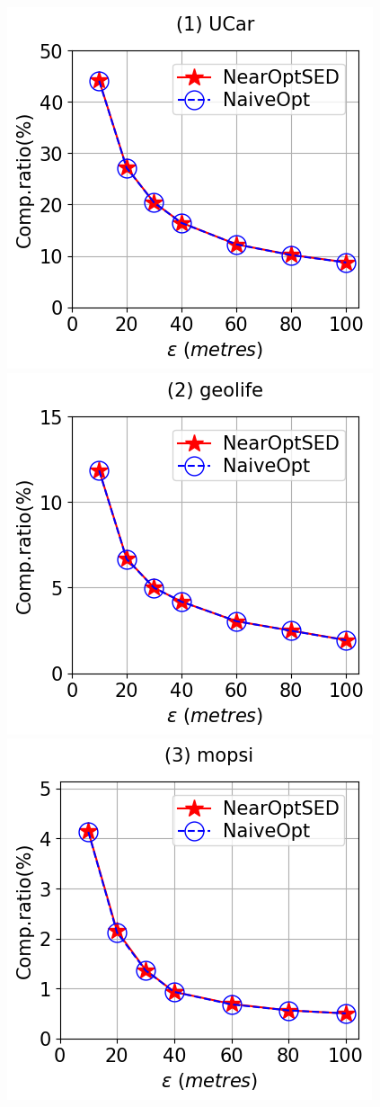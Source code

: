 \begin{figure}[h]
	\vspace{-1.5ex}
	\centering
	\hspace{-2ex}
	\includegraphics[scale=0.2]{Figures/Exp-Append-NearOpt-CR-epsilon-service.png}	
	\includegraphics[scale=0.2]{Figures/Exp-Append-NearOpt-CR-epsilon-geolife.png}		
	\includegraphics[scale=0.2]{Figures/Exp-Append-NearOpt-CR-epsilon-mopsi.png}		

\end{figure}
